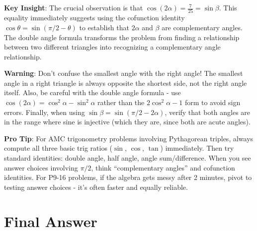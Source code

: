 \documentclass[11pt]{article}
\begin{document}
\begin{keyinsightbox}
\textbf{Key Insight}: The crucial observation is that $\cos(2\alpha) = \frac{7}{25} = \sin\beta$. This equality immediately suggests using the cofunction identity $\cos\theta = \sin(\pi/2 - \theta)$ to establish that $2\alpha$ and $\beta$ are complementary angles. The double angle formula transforms the problem from finding a relationship between two different triangles into recognizing a complementary angle relationship.
\end{keyinsightbox}

\begin{warningbox}
\textbf{Warning}: Don't confuse the smallest angle with the right angle! The smallest angle in a right triangle is always opposite the shortest side, not the right angle itself. Also, be careful with the double angle formula - use $\cos(2\alpha) = \cos^2\alpha - \sin^2\alpha$ rather than the $2\cos^2\alpha - 1$ form to avoid sign errors. Finally, when using $\sin\beta = \sin(\pi/2 - 2\alpha)$, verify that both angles are in the range where sine is injective (which they are, since both are acute angles).
\end{warningbox}

\begin{tipbox}
\textbf{Pro Tip}: For AMC trigonometry problems involving Pythagorean triples, always compute all three basic trig ratios ($\sin$, $\cos$, $\tan$) immediately. Then try standard identities: double angle, half angle, angle sum/difference. When you see answer choices involving $\pi/2$, think ``complementary angles'' and cofunction identities. For P9-16 problems, if the algebra gets messy after 2 minutes, pivot to testing answer choices - it's often faster and equally reliable.
\end{tipbox}

\section*{Final Answer}

\end{document}

